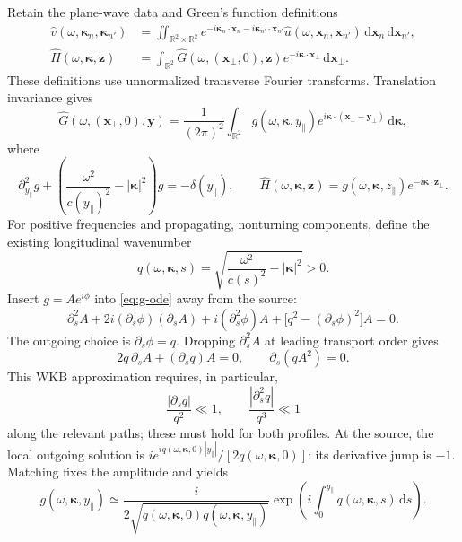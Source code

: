 \documentclass[11pt]{article}
\newcommand{\R}{\mathbb{R}}
\newcommand{\bx}{\bm{x}}
\newcommand{\by}{\bm{y}}
\newcommand{\bz}{\bm{z}}
\newcommand{\bkappa}{\boldsymbol{\kappa}}
\newcommand{\dd}{\,\mathrm{d}}
\begin{document}
Retain the plane-wave data and Green's function definitions
\begin{align}
\widehat v(\omega,\bkappa_n,\bkappa_{n'})
&=\iint_{\R^2\times\R^2}
e^{-i\bkappa_n\cdot\bx_n-i\bkappa_{n'}\cdot\bx_{n'}}
\widehat u(\omega,\bx_n,\bx_{n'})\dd\bx_n\dd\bx_{n'},
\label{eq:plane-data}\\
\widehat H(\omega,\bkappa,\bz)
&=\int_{\R^2}
\widehat G(\omega,(\bx_\perp,0),\bz)
e^{-i\bkappa\cdot\bx_\perp}\dd\bx_\perp.
\end{align}
These definitions use unnormalized transverse Fourier transforms.
Translation invariance gives
\begin{equation}
\widehat G(\omega,(\bx_\perp,0),\by)
=\frac{1}{(2\pi)^2}\int_{\R^2}
g(\omega,\bkappa,y_\parallel)
e^{i\bkappa\cdot(\bx_\perp-\by_\perp)}\dd\bkappa,
\end{equation}
where
\begin{equation}
\partial_{y_\parallel}^2g+
\left(\frac{\omega^2}{c(y_\parallel)^2}-|\bkappa|^2\right)g
=-\delta(y_\parallel),
\qquad
\widehat H(\omega,\bkappa,\bz)
=g(\omega,\bkappa,z_\parallel)e^{-i\bkappa\cdot\bz_\perp}.
\label{eq:g-ode}
\end{equation}
For positive frequencies and propagating, nonturning components, define
the existing longitudinal wavenumber
\begin{equation}
q(\omega,\bkappa,s)
=\sqrt{\frac{\omega^2}{c(s)^2}-|\bkappa|^2}>0.
\end{equation}
Insert $g=Ae^{i\phi}$ into \eqref{eq:g-ode} away from the source:
\begin{equation}
\partial_s^2A+2i(\partial_s\phi)(\partial_sA)
+i(\partial_s^2\phi)A+
\big[q^2-(\partial_s\phi)^2\big]A=0.
\end{equation}
The outgoing choice is $\partial_s\phi=q$. Dropping $\partial_s^2A$
at leading transport order gives
\begin{equation}
2q\,\partial_s A+(\partial_s q)A=0,
\qquad \partial_s(qA^2)=0.
\end{equation}
This WKB approximation requires, in particular,
\begin{equation}
\frac{|\partial_s q|}{q^2}\ll1,
\qquad
\frac{|\partial_s^2q|}{q^3}\ll1
\label{eq:WKB-conditions}
\end{equation}
along the relevant paths; these must hold for both profiles.
At the source, the local outgoing solution is
$i e^{iq(\omega,\bkappa,0)|y_\parallel|}/[2q(\omega,\bkappa,0)]$:
its derivative jump is $-1$. Matching fixes the amplitude and yields
\begin{equation}
g(\omega,\bkappa,y_\parallel)
\simeq\frac{i}{2\sqrt{q(\omega,\bkappa,0)
q(\omega,\bkappa,y_\parallel)}}
\exp\!\left(i\int_0^{y_\parallel}q(\omega,\bkappa,s)\dd s\right).
\label{eq:WKB-g}
\end{equation}
\end{document}
